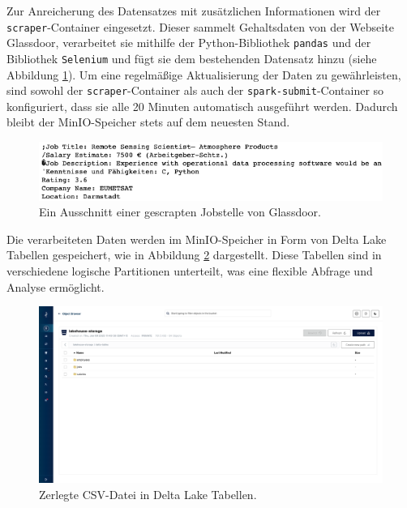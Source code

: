 Zur Anreicherung des Datensatzes mit zusätzlichen Informationen wird der \lstinline|scraper|-Container eingesetzt. Dieser sammelt Gehaltsdaten von der Webseite Glassdoor, verarbeitet sie mithilfe der Python-Bibliothek \lstinline|pandas| und der Bibliothek \lstinline|Selenium| und fügt sie dem bestehenden Datensatz hinzu (siehe Abbildung \ref{fig:Scraper}). Um eine regelmäßige Aktualisierung der Daten zu gewährleisten, sind sowohl der \lstinline|scraper|-Container als auch der \lstinline|spark-submit|-Container so konfiguriert, dass sie alle 20 Minuten automatisch ausgeführt werden. Dadurch bleibt der MinIO-Speicher stets auf dem neuesten Stand.

\begin{figure}[H]
    \centering
    \includegraphics[width=0.8\linewidth]{graphics/scraper.png}
    \caption[Ein Ausschnitt einer gescrapten Jobstelle von Glassdoor]{Ein Ausschnitt einer gescrapten Jobstelle von Glassdoor.}
    \label{fig:Scraper}
\end{figure}

Die verarbeiteten Daten werden im MinIO-Speicher in Form von Delta Lake Tabellen gespeichert, wie in Abbildung \ref{fig:Delta-Tables} dargestellt. Diese Tabellen sind in verschiedene logische Partitionen unterteilt, was eine flexible Abfrage und Analyse ermöglicht.

\begin{figure}[H]
    \centering
    \includegraphics[width=1\linewidth]{graphics/delta-folder.png}
    \caption[Zerlegte CSV-Datei in Delta Lake Tabellen]{Zerlegte CSV-Datei in Delta Lake Tabellen.}
    \label{fig:Delta-Tables}
\end{figure}

